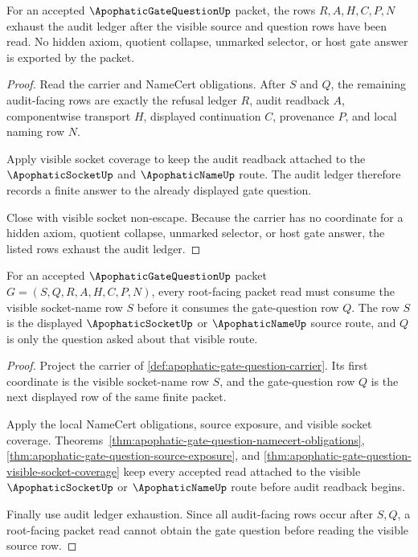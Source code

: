 \begin{theorem}
\label{thm:apophatic-gate-question-audit-ledger-exhaustion}
For an accepted $\ApophaticGateQuestionUp$ packet, the rows
$R,A,H,C,P,N$ exhaust the audit ledger after the visible source and question
rows have been read. No hidden axiom, quotient collapse, unmarked selector, or
host gate answer is exported by the packet.
\end{theorem}
\begin{proof}
Read the carrier and NameCert obligations. After $S$ and $Q$, the remaining
audit-facing rows are exactly the refusal ledger $R$, audit readback $A$,
componentwise transport $H$, displayed continuation $C$, provenance $P$, and
local naming row $N$.

Apply visible socket coverage to keep the audit readback attached to the
$\ApophaticSocketUp$ and $\ApophaticNameUp$ route. The audit ledger therefore
records a finite answer to the already displayed gate question.

Close with visible socket non-escape. Because the carrier has no coordinate for
a hidden axiom, quotient collapse, unmarked selector, or host gate answer, the
listed rows exhaust the audit ledger.
\end{proof}

\begin{theorem}
\label{thm:apophatic-gate-question-root-visible-source}
For an accepted $\ApophaticGateQuestionUp$ packet $G=(S,Q,R,A,H,C,P,N)$, every root-facing packet read must consume the visible socket-name row $S$ before it consumes the gate-question row $Q$. The row $S$ is the displayed $\ApophaticSocketUp$ or $\ApophaticNameUp$ source route, and $Q$ is only the question asked about that visible route.
\end{theorem}
\begin{proof}
Project the carrier of \autoref{def:apophatic-gate-question-carrier}. Its first coordinate is the visible socket-name row $S$, and the gate-question row $Q$ is the next displayed row of the same finite packet.

Apply the local NameCert obligations, source exposure, and visible socket coverage. Theorems~\ref{thm:apophatic-gate-question-namecert-obligations}, \ref{thm:apophatic-gate-question-source-exposure}, and \ref{thm:apophatic-gate-question-visible-socket-coverage} keep every accepted read attached to the visible $\ApophaticSocketUp$ or $\ApophaticNameUp$ route before audit readback begins.

Finally use audit ledger exhaustion. Since all audit-facing rows occur after $S,Q$, a root-facing packet read cannot obtain the gate question before reading the visible source row.
\end{proof}

